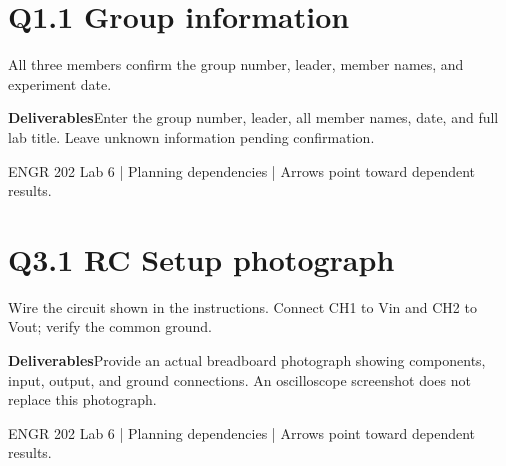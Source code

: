 \documentclass[11pt]{article}
\begin{document}
\section*{Q1.1 Group information}
All three members confirm the group number, leader, member names, and experiment date.\par\medskip
\textbf{Deliverables}\quad Enter the group number, leader, all member names, date, and full lab title. Leave unknown information pending confirmation.\par\bigskip
\begin{center}\end{center}
\vfill\small ENGR 202 Lab 6 | Planning dependencies | Arrows point toward dependent results.
\newpage
\section*{Q3.1 RC Setup photograph}
Wire the circuit shown in the instructions. Connect CH1 to Vin and CH2 to Vout; verify the common ground.\par\medskip
\textbf{Deliverables}\quad Provide an actual breadboard photograph showing components, input, output, and ground connections. An oscilloscope screenshot does not replace this photograph.\par\bigskip
\begin{center}\end{center}
\vfill\small ENGR 202 Lab 6 | Planning dependencies | Arrows point toward dependent results.
\newpage
\end{document}

